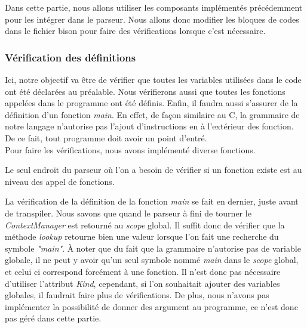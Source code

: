 \documentclass[a4paper]{article}%
\begin{document}
Dans cette partie, nous allons utiliser les composants implémentés précédemment
pour les intégrer dans le parseur. Nous allons donc modifier les bloques de
codes dans le fichier bison pour faire des vérifications lorsque c'est
nécessaire.

\subsubsection*{Vérification des définitions}

Ici, notre objectif va être de vérifier que toutes les variables utilisées dans
le code ont été déclarées au préalable. Nous vérifierons aussi que toutes les
fonctions appelées dans le programme ont été définis. Enfin, il faudra aussi
s'assurer de la définition d'un fonction \textit{main}. En effet, de façon
similaire au C, la grammaire de notre langage n'autorise pas l'ajout
d'instructions en à l'extérieur des fonction. De ce fait, tout programme doit
avoir un point d'entré.\\

Pour faire les vérifications, nous avons implémenté diverse fonctions. %




Le seul endroit du parseur où l'on a besoin de vérifier si un fonction existe
est au niveau des appel de fonctions.


La vérification de la définition de la fonction \textit{main} se fait en
dernier, juste avant de transpiler. Nous savons que quand le parseur à fini de
tourner le \textit{ContextManager} est retourné au \textit{scope} global. Il
suffit donc de vérifier que la méthode \textit{lookup} retourne bien une valeur
lorsque l'on fait une recherche du symbole \textit{"main"}. À noter que du fait
que la grammaire n'autorise pas de variable globale, il ne peut y avoir qu'un
seul symbole nommé \textit{main} dans le \textit{scope} global, et celui ci
correspond forcément à une fonction. Il n'est donc pas nécessaire d'utiliser
l'attribut \textit{Kind}, cependant, si l'on souhaitait ajouter des variables
globales, il faudrait faire plus de vérifications. De plus, nous n'avons pas
implémenter la possibilité de donner des argument au programme, ce n'est donc
pas géré dans cette partie. %
\end{document}
